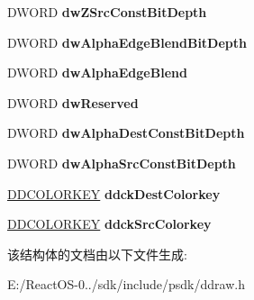 \begin{DoxyCompactItemize}
\mbox{\label{struct___d_d_b_l_t_f_x_a151516eea1e7764c61ad637525a7a61e}} 
D\+W\+O\+RD {\bfseries dw\+Z\+Src\+Const\+Bit\+Depth}
\item 
\mbox{\label{struct___d_d_b_l_t_f_x_ad7516be1243f123f285bccb6d7b69a2d}} 
D\+W\+O\+RD {\bfseries dw\+Alpha\+Edge\+Blend\+Bit\+Depth}
\item 
\mbox{\label{struct___d_d_b_l_t_f_x_ae3e5c522bae01f9e6d98a86c3da39ac9}} 
D\+W\+O\+RD {\bfseries dw\+Alpha\+Edge\+Blend}
\item 
\mbox{\label{struct___d_d_b_l_t_f_x_a2d87d1d2231877b89cb84358ac7f2dfd}} 
D\+W\+O\+RD {\bfseries dw\+Reserved}
\item 
\mbox{\label{struct___d_d_b_l_t_f_x_a3566d668c04d0d096be30f7e0604525b}} 
D\+W\+O\+RD {\bfseries dw\+Alpha\+Dest\+Const\+Bit\+Depth}
\item 
\mbox{\label{struct___d_d_b_l_t_f_x_ac6979eb365e1f55e62c9028c73f7cda5}} 
D\+W\+O\+RD {\bfseries dw\+Alpha\+Src\+Const\+Bit\+Depth}
\item 
\mbox{\label{struct___d_d_b_l_t_f_x_aa0d17da9e4ba0a0aa5d2a0a4e7b11385}} 
\hyperlink{struct_d_d_c_o_l_o_r_k_e_y}{D\+D\+C\+O\+L\+O\+R\+K\+EY} {\bfseries ddck\+Dest\+Colorkey}
\item 
\mbox{\label{struct___d_d_b_l_t_f_x_a66ae74e18625fe02dd8d310bd786d12d}} 
\hyperlink{struct_d_d_c_o_l_o_r_k_e_y}{D\+D\+C\+O\+L\+O\+R\+K\+EY} {\bfseries ddck\+Src\+Colorkey}
\end{DoxyCompactItemize}


该结构体的文档由以下文件生成\+:\begin{DoxyCompactItemize}
\item 
E\+:/\+React\+O\+S-\/0../sdk/include/psdk/ddraw.\+h\end{DoxyCompactItemize}
